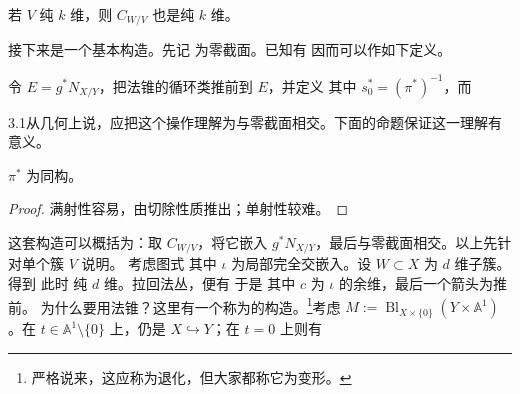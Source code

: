 \begin{proposition}\label{pro:3.6}若 $V$ 纯 $k$ 维，则 $C_{W/V}$ 也是纯 $k$ 维。\end{proposition}
接下来是一个基本构造。先记
为零截面。已知有
因而可以作如下定义。
\begin{definition}[Gysin 拉回]\label{def:3.4}
令 $E=g^*N_{X/Y}$，把法锥的循环类推前到 $E$，并定义
其中 $s_0^*=(\pi^*)^{-1}$，而
\end{definition}
\begin{Note}{3.1}从几何上说，应把这个操作理解为与零截面相交。下面的命题保证这一理解有意义。\end{Note}
\begin{proposition}\label{pro:3.7}$\pi^*$ 为同构。\end{proposition}
\begin{proof}满射性容易，由切除性质推出；单射性较难。\end{proof}
这套构造可以概括为：取 $C_{W/V}$，将它嵌入 $g^*N_{X/Y}$，最后与零截面相交。以上先针对单个簇 $V$ 说明。
考虑图式
其中 $\iota$ 为局部完全交嵌入。设 $W\subset X$ 为 $d$ 维子簇。得到
此时
纯 $d$ 维。拉回法丛，便有
于是
其中 $c$ 为 $\iota$ 的余维，最后一个箭头为推前。
为什么要用法锥？这里有一个称为的构造。\footnote{严格说来，这应称为退化，但大家都称它为变形。}考虑 $M:=\operatorname{Bl}_{X\times\{0\}}(Y\times\mathbb A^1)$。在 $t\in\mathbb A^1\setminus\{0\}$ 上，仍是 $X\hookrightarrow Y$；在 $t=0$ 上则有

